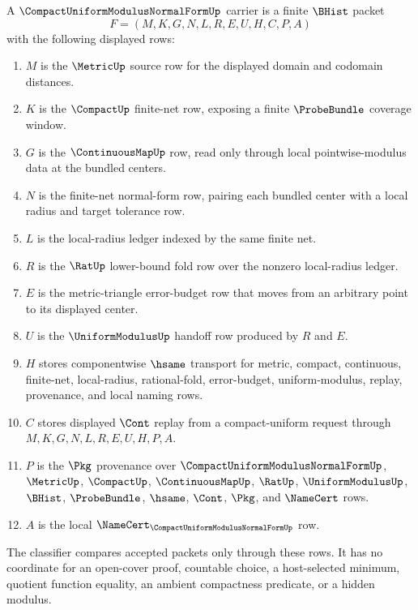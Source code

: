 \begin{definition}
\label{def:compact-uniform-modulus-normal-form-carrier}
A $\CompactUniformModulusNormalFormUp$ carrier is a finite $\BHist$ packet
$$
F=(M,K,G,N,L,R,E,U,H,C,P,A)
$$
with the following displayed rows:
\begin{enumerate}
\item $M$ is the $\MetricUp$ source row for the displayed domain and codomain distances.
\item $K$ is the $\CompactUp$ finite-net row, exposing a finite $\ProbeBundle$ coverage window.
\item $G$ is the $\ContinuousMapUp$ row, read only through local pointwise-modulus data at the bundled centers.
\item $N$ is the finite-net normal-form row, pairing each bundled center with a local radius and target tolerance row.
\item $L$ is the local-radius ledger indexed by the same finite net.
\item $R$ is the $\RatUp$ lower-bound fold row over the nonzero local-radius ledger.
\item $E$ is the metric-triangle error-budget row that moves from an arbitrary point to its displayed center.
\item $U$ is the $\UniformModulusUp$ handoff row produced by $R$ and $E$.
\item $H$ stores componentwise $\hsame$ transport for metric, compact, continuous, finite-net, local-radius, rational-fold, error-budget, uniform-modulus, replay, provenance, and local naming rows.
\item $C$ stores displayed $\Cont$ replay from a compact-uniform request through $M,K,G,N,L,R,E,U,H,P,A$.
\item $P$ is the $\Pkg$ provenance over $\CompactUniformModulusNormalFormUp$, $\MetricUp$, $\CompactUp$, $\ContinuousMapUp$, $\RatUp$, $\UniformModulusUp$, $\BHist$, $\ProbeBundle$, $\hsame$, $\Cont$, $\Pkg$, and $\NameCert$ rows.
\item $A$ is the local $\NameCert_{\CompactUniformModulusNormalFormUp}$ row.
\end{enumerate}
The classifier compares accepted packets only through these rows. It has no coordinate for an open-cover proof, countable choice, a host-selected minimum, quotient function equality, an ambient compactness predicate, or a hidden modulus.
\end{definition}

